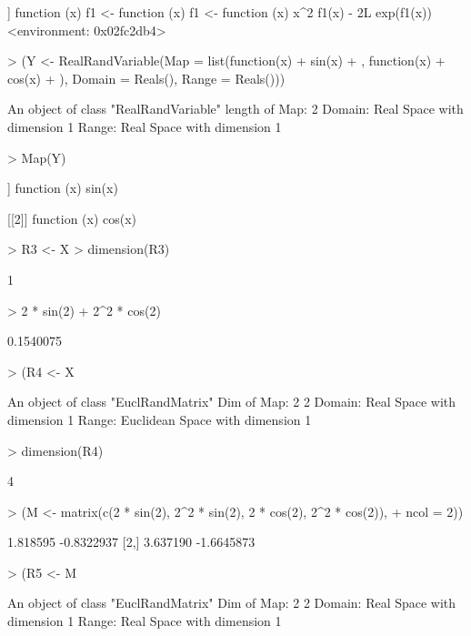 \documentclass[11pt]{article}
\begin{document}
\begin{Schunk}
\begin{Soutput}
[[2]]
function (x) 
{
    f1 <- function (x) 
    {
        f1 <- function (x) 
        {
            x^2
        }
        f1(x) - 2L
    }
    exp(f1(x))
}
<environment: 0x02fc2db4>
\end{Soutput}
\begin{Sinput}
> (Y <- RealRandVariable(Map = list(function(x) {
+     sin(x)
+ }, function(x) {
+     cos(x)
+ }), Domain = Reals(), Range = Reals()))
\end{Sinput}
\begin{Soutput}
An object of class "RealRandVariable" 
length of Map:	 2 
Domain:	Real Space with dimension 1 
Range:	Real Space with dimension 1 
\end{Soutput}
\begin{Sinput}
> Map(Y)
\end{Sinput}
\begin{Soutput}
[[1]]
function (x) 
{
    sin(x)
}

[[2]]
function (x) 
{
    cos(x)
}
\end{Soutput}
\begin{Sinput}
> R3 <- X %
> dimension(R3)
\end{Sinput}
\begin{Soutput}
[1] 1
\end{Soutput}
\begin{Sinput}
> 2 * sin(2) + 2^2 * cos(2)
\end{Sinput}
\begin{Soutput}
[1] 0.1540075
\end{Soutput}
\begin{Sinput}
> (R4 <- X %
\end{Sinput}
\begin{Soutput}
An object of class "EuclRandMatrix" 
Dim of Map:	 2 2 
Domain:	Real Space with dimension 1 
Range:	Euclidean Space with dimension 1 
\end{Soutput}
\begin{Sinput}
> dimension(R4)
\end{Sinput}
\begin{Soutput}
[1] 4
\end{Soutput}
\begin{Sinput}
> (M <- matrix(c(2 * sin(2), 2^2 * sin(2), 2 * cos(2), 2^2 * cos(2)), 
+     ncol = 2))
\end{Sinput}
\begin{Soutput}
         [,1]       [,2]
[1,] 1.818595 -0.8322937
[2,] 3.637190 -1.6645873
\end{Soutput}
\begin{Sinput}
> (R5 <- M %
\end{Sinput}
\begin{Soutput}
An object of class "EuclRandMatrix" 
Dim of Map:	 2 2 
Domain:	Real Space with dimension 1 
Range:	Real Space with dimension 1 
\end{Soutput}
\end{Schunk}
\end{document}
